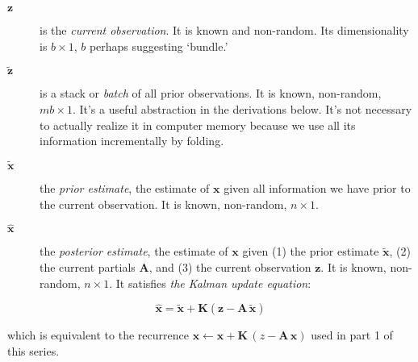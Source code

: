 \documentclass[10pt,oneside,x11names]{article}
\begin{document}
\begin{description}
\item[{\(\mathbold{z}\)}] is the \emph{current observation}. It is known and non-random.
Its dimensionality is \(b\times{1}\), \(b\) perhaps suggesting `bundle.'

\item[{\(\tilde{\mathbold{z}}\)}] is a stack or \emph{batch} of all prior observations. It
is known, non-random, \(m b\times{1}\). It's a useful abstraction in the
derivations below. It's not necessary to actually realize it in computer
memory because we use all its information incrementally by folding.

\item[{\({\tilde{\mathbold{x}}}\)}] the \emph{prior estimate}, the estimate of
\(\mathbold{x}\) given all information we have prior to the current
observation. It is known, non-random, \(n\times{1}\).

\item[{\({\hat{\mathbold{x}}}\)}] the \emph{posterior estimate}, the estimate of
\(\mathbold{x}\) given (1) the prior estimate \({\tilde{\mathbold{x}}}\), (2)
the current partials \(\mathbold{A}\), and (3) the current observation
\(\mathbold{z}\). It is known, non-random, \(n\times{1}\). It satisfies
\emph{the Kalman update equation}:
\end{description}

\begin{equation}
\label{eqn:kalman-update-equation}
{\hat{\mathbold{x}}} =
{\tilde{\mathbold{x}}} +
\mathbold{K}
\left(
\mathbold{z}-
\mathbold{A}\,
{\tilde{\mathbold{x}}}
\right)
\end{equation}

\noindent which is equivalent to  the recurrence
\(\mathbold{x}\leftarrow\mathbold{x}+\mathbold{K}\,(z-\mathbold{A}\,\mathbold{x})\)
used in part 1 of this series.
\end{document}

